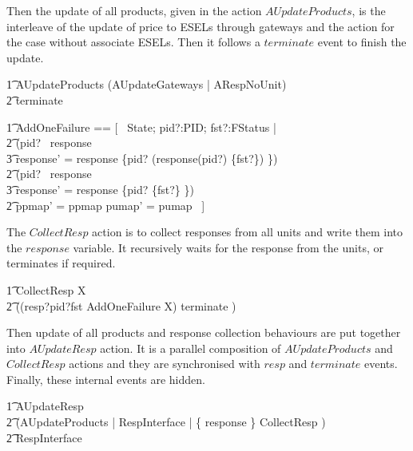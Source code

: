 Then the update of all products, given in the action $AUpdateProducts$, is the interleave of the update of price to ESELs through gateways and the action for the case without associate ESELs. Then it follows a $terminate$ event to finish the update.
\begin{circusaction}
    \t1 AUpdateProducts \circdef (AUpdateGateways \linter \emptyset | \emptyset \rinter ARespNoUnit) \circseq \\
        \t2 terminate \then \Skip
\end{circusaction}

\begin{zed}
    \t1 AddOneFailure == [~ \Delta State; pid?:PID; fst?:FStatus | \\
        \t2 (pid? \in \dom~response \implies \\
            \t3 response' = response \oplus \{pid? \mapsto (response(pid?) \cup \{fst?\}) \}) \land \\
        \t2 (pid? \notin \dom~response \implies \\
            \t3 response' = response \cup \{pid? \mapsto \{fst?\} \}) \land \\
        \t2 ppmap' = ppmap \land pumap' = pumap ~]
\end{zed}

The $CollectResp$ action is to collect responses from all units and write them into the $response$ variable. It recursively waits for the response from the units, or terminates if required.
\begin{circusaction}
        \t1 CollectResp \circdef \circmu X \circspot \\
            \t2 ((resp?pid?fst \then \lschexpract AddOneFailure \rschexpract \circseq X) \extchoice terminate \then \Skip) 
\end{circusaction}

Then update of all products and response collection behaviours are put together into $AUpdateResp$ action. It is a parallel composition of $AUpdateProducts$ and $CollectResp$ actions and they are synchronised with $resp$ and $terminate$ events. Finally, these internal events are hidden.
\begin{circusaction}
        \t1 AUpdateResp \circdef \\
            \t2 (AUpdateProducts \lpar \emptyset | RespInterface | \{ response \} \rpar CollectResp ) \\
            \t2 \circhide RespInterface \\
\end{circusaction}

